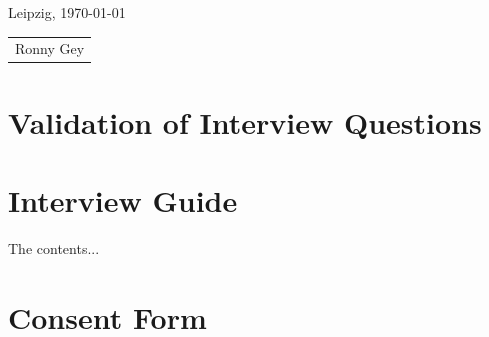 \documentclass[12pt,a4paper,titlepage,oneside,abstract=true,toc=listof,toc=bibliography]{scrreprt}
\begin{document}
Leipzig,  \today\\[6ex]
\flushleft
\newlength\us
\settowidth{\us}{Ronny Gey}
\begin{tabular}{p{\us}}\hline
\centering\footnotesize Ronny Gey
\end{tabular}

\cleardoublepage

\begin{appendices}
\appendixpage

\chapter{Validation of Interview Questions}

\cleardoublepage

\chapter{Interview Guide}
The contents...

\cleardoublepage

\chapter{Consent Form}

\end{appendices}
\end{document}

